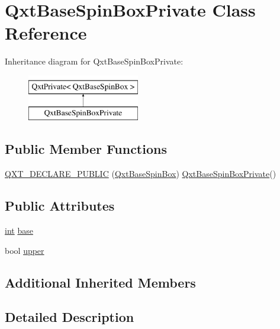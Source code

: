 \hypertarget{class_qxt_base_spin_box_private}{\section{Qxt\-Base\-Spin\-Box\-Private Class Reference}
\label{class_qxt_base_spin_box_private}
}
Inheritance diagram for Qxt\-Base\-Spin\-Box\-Private\-:\begin{figure}[H]
\begin{center}
\leavevmode
\includegraphics[height=2.000000cm]{class_qxt_base_spin_box_private}
\end{center}
\end{figure}
\subsection*{Public Member Functions}
\begin{DoxyCompactItemize}
\item 
\hyperlink{class_qxt_base_spin_box_private_a1727a1982047e3519238af95aa6fb832}{Q\-X\-T\-\_\-\-D\-E\-C\-L\-A\-R\-E\-\_\-\-P\-U\-B\-L\-I\-C} (\hyperlink{class_qxt_base_spin_box}{Qxt\-Base\-Spin\-Box}) \hyperlink{class_qxt_base_spin_box_private}{Qxt\-Base\-Spin\-Box\-Private}()
\end{DoxyCompactItemize}
\subsection*{Public Attributes}
\begin{DoxyCompactItemize}
\item 
\hyperlink{ioapi_8h_a787fa3cf048117ba7123753c1e74fcd6}{int} \hyperlink{class_qxt_base_spin_box_private_ab752be669df63e365a85c3c7a861f56b}{base}
\item 
bool \hyperlink{class_qxt_base_spin_box_private_aa295ed41b2e35dd60d8c728a550cac02}{upper}
\end{DoxyCompactItemize}
\subsection*{Additional Inherited Members}


\subsection{Detailed Description}


